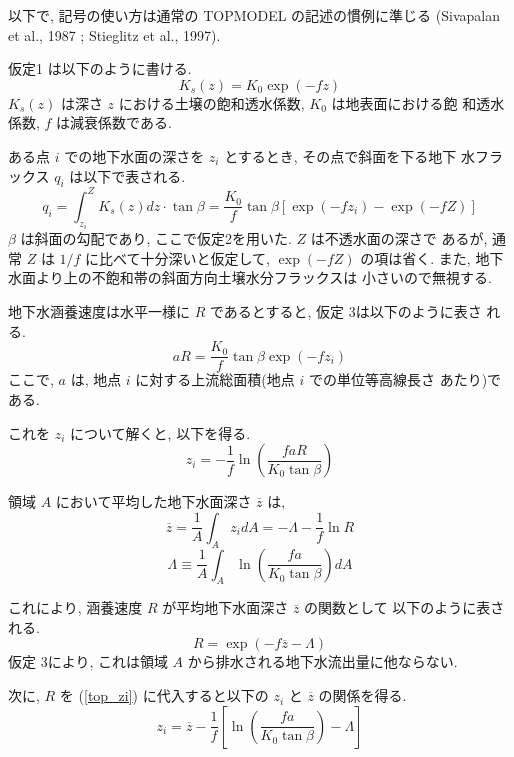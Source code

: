 以下で, 記号の使い方は通常の TOPMODEL の記述の慣例に準じる
(Sivapalan et al., 1987 ; Stieglitz et al., 1997). 

仮定1 は以下のように書ける. 
\begin{equation}
 K_s(z) = K_0 \exp (-f z)
\end{equation}
$K_s(z)$ は深さ $z$ における土壌の飽和透水係数, $K_0$ は地表面における飽
和透水係数, $f$ は減衰係数である. 

ある点 $i$ での地下水面の深さを $z_i$ とするとき, その点で斜面を下る地下
水フラックス $q_i$ は以下で表される. 
\begin{equation}
 q_i = \int_{z_i}^Z K_s(z) dz \cdot \tan\beta
   = \frac{K_0}{f}  \tan\beta [\exp(-f z_i) - \exp(-f Z)]
 \label{top_qi}
\end{equation}
$\beta$ は斜面の勾配であり, ここで仮定2を用いた. $Z$ は不透水面の深さで
あるが, 通常 $Z$ は $1/f$ に比べて十分深いと仮定して, $\exp(-f Z)$
の項は省く. また, 地下水面より上の不飽和帯の斜面方向土壌水分フラックスは
小さいので無視する. 

地下水涵養速度は水平一様に $R$ であるとすると, 仮定 3は以下のように表さ
れる. 
\begin{equation}
 a R = \frac{K_0}{f} \tan\beta \exp(-f z_i)
\end{equation}
ここで, $a$ は, 地点 $i$ に対する上流総面積(地点 $i$ での単位等高線長さ
あたり)である. 

これを $z_i$ について解くと, 以下を得る. 
\begin{equation}
 z_i = -\frac{1}{f} \ln \left( \frac{faR}{K_0 \tan \beta}\right)
 \label{top_zi}
\end{equation}

領域 $A$ において平均した地下水面深さ $\overline{z}$ は, 
\begin{equation}
   \overline{z} = \frac1{A}\int_{A} z_i dA
  = - \Lambda - \frac1{f} \ln R
 \label{top_zbar}
\end{equation}  
\begin{equation}
 \Lambda \equiv
  \frac1{A}\int_{A} \ln \left( \frac{fa}{K_0 \tan \beta}\right) dA
\end{equation}

これにより, 涵養速度 $R$ が平均地下水面深さ $\overline{z}$ の関数として
以下のように表される. 
\begin{equation}
 R = \exp (-f \overline{z} -\Lambda)
 \label{top_r}
\end{equation}
仮定 3により, これは領域 $A$ から排水される地下水流出量に他ならない. 

次に, $R$ を (\ref{top_zi}) に代入すると以下の $z_i$ と $\overline{z}$
の関係を得る. 
\begin{equation}
 z_i = \overline{z} - \frac{1}{f} \left[
\ln \left( \frac{fa}{K_0 \tan \beta}\right) - \Lambda
\right]
 \label{top_zizbar}
\end{equation}

